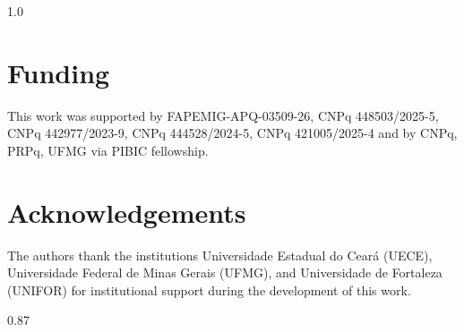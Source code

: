 \documentclass[final,3p,times,11pt,authoryear]{elsarticle}
\theoremstyle{plain}
\theoremstyle{definition}
\theoremstyle{remark}
\begin{document}
\begin{spacing}{1.0}
\section*{Funding}
This work was supported by FAPEMIG-APQ-03509-26, CNPq 448503/2025-5, CNPq 442977/2023-9, CNPq 444528/2024-5, CNPq 421005/2025-4 and by CNPq, PRPq, UFMG via PIBIC fellowship.

\section*{Acknowledgements}
The authors thank the institutions Universidade Estadual do Ceará (UECE), Universidade Federal de Minas Gerais (UFMG), and Universidade de Fortaleza (UNIFOR) for institutional support during the
development of this work.

\end{spacing}
\endgroup

\begingroup
\scriptsize
\setlength{\bibsep}{0pt}
\begin{spacing}{0.87}


\end{spacing}
\endgroup
\end{document}
